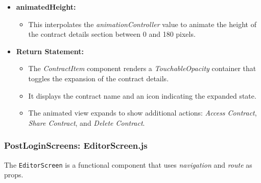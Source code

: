 \begin{itemize}
    \item \textbf{animatedHeight:}
    \begin{itemize}
        \item This interpolates the \textit{animationController} value to animate the height of the contract details section between 0 and 180 pixels.
    \end{itemize}

    \item \textbf{Return Statement:}
    \begin{itemize}
        \item The \textit{ContractItem} component renders a \textit{TouchableOpacity} container that toggles the expansion of the contract details.
        \item It displays the contract name and an icon indicating the expanded state.
        \item The animated view expands to show additional actions: \textit{Access Contract}, \textit{Share Contract}, and \textit{Delete Contract}.
    \end{itemize}
\end{itemize}

\subsubsection{PostLoginScreens: EditorScreen.js}

The \texttt{EditorScreen} is a functional component that uses \textit{navigation} and \textit{route} as props.

